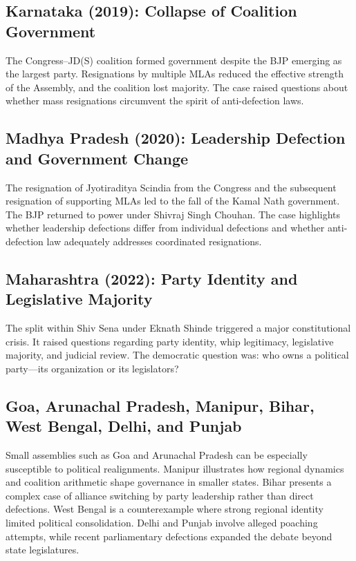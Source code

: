 \documentclass[11pt]{article}
\begin{document}
\subsection{Karnataka (2019): Collapse of Coalition Government}
The Congress--JD(S) coalition formed government despite the BJP emerging as the largest party. Resignations by multiple MLAs reduced the effective strength of the Assembly, and the coalition lost majority. The case raised questions about whether mass resignations circumvent the spirit of anti-defection laws.

\subsection{Madhya Pradesh (2020): Leadership Defection and Government Change}
The resignation of Jyotiraditya Scindia from the Congress and the subsequent resignation of supporting MLAs led to the fall of the Kamal Nath government. The BJP returned to power under Shivraj Singh Chouhan. The case highlights whether leadership defections differ from individual defections and whether anti-defection law adequately addresses coordinated resignations.

\subsection{Maharashtra (2022): Party Identity and Legislative Majority}
The split within Shiv Sena under Eknath Shinde triggered a major constitutional crisis. It raised questions regarding party identity, whip legitimacy, legislative majority, and judicial review. The democratic question was: who owns a political party---its organization or its legislators?

\subsection{Goa, Arunachal Pradesh, Manipur, Bihar, West Bengal, Delhi, and Punjab}
Small assemblies such as Goa and Arunachal Pradesh can be especially susceptible to political realignments. Manipur illustrates how regional dynamics and coalition arithmetic shape governance in smaller states. Bihar presents a complex case of alliance switching by party leadership rather than direct defections. West Bengal is a counterexample where strong regional identity limited political consolidation. Delhi and Punjab involve alleged poaching attempts, while recent parliamentary defections expanded the debate beyond state legislatures.
\end{document}
